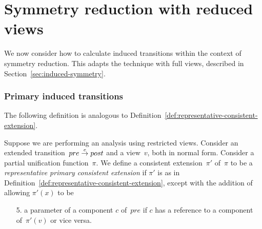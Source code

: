 \section{Symmetry reduction with reduced views}
\label{sec:effectOn-restricted}


We now consider how to calculate induced transitions within the context of
symmetry reduction.  This adapts the technique with full views, described in
Section~\ref{sec:induced-symmetry}.


\subsubsection{Primary induced transitions}

The following definition is analogous to
Definition~\ref{def:representative-consistent-extension}.
%
\begin{definition} 
\label{def:representative-consistent-extension-singleRef-primary}
Suppose we are performing an analysis using restricted views.  Consider an
extended transition~$pre \stackrel{e}\rightarrow post$ and a view~$v$, both in normal form.
Consider a partial unification function~$\pi$.
%
We define a consistent extension~$\pi'$ of~$\pi$ to be a \emph{representative
  primary consistent extension} if $\pi'$ is as in
Definition~\ref{def:representative-consistent-extension}, except with the
addition of allowing $\pi'(x)$ to be
\begin{enumerate}
\item[5.] a parameter of a component $c$ of~$pre$ if $c$ has a reference to a
  component of~$\pi'(v)$ or vice versa.
\end{enumerate}
\end{definition}


